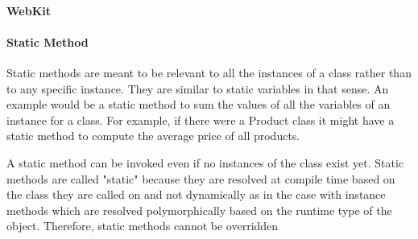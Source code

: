 \documentclass{book}
\begin{document}
\paragraph{WebKit}

\paragraph{Static Method}

Static methods are meant to be relevant to all the instances of a class rather than to any specific instance. They are similar to static variables in that sense. An example would be a static method to sum the values of all the variables of an instance for a class. For example, if there were a Product class it might have a static method to compute the average price of all products.

A static method can be invoked even if no instances of the class exist yet. Static methods are called "static" because they are resolved at compile time based on the class they are called on and not dynamically as in the case with instance methods which are resolved polymorphically based on the runtime type of the object. Therefore, static methods cannot be overridden
\end{document}
